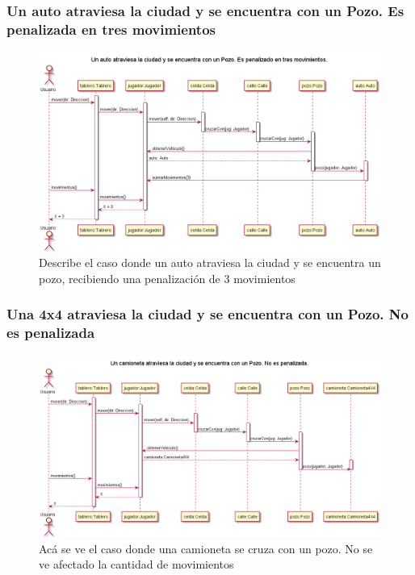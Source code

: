 \documentclass[titlepage,a4paper]{article}
\begin{document}
\subsubsection[Un auto atraviesa la ciudad y se encuentra con un Pozo. Es penalizada en tres movimientos]{Un auto atraviesa la ciudad y se encuentra con un Pozo. Es penalizada en tres movimientos}

\begin{figure}[H]
  \centering
  \includegraphics[width=1\textwidth]{diagramas/SecuenciaAutoCruzaUnPozoYEsPenalizado.png}
  \caption{\label{fig:class01} Describe el caso donde un auto atraviesa la ciudad y se encuentra un pozo, recibiendo una penalización de 3 movimientos}
\end{figure}


\subsubsection[Una 4x4 atraviesa la ciudad y se encuentra con un Pozo. No es penalizada]{Una 4x4 atraviesa la ciudad y se encuentra con un Pozo. No es penalizada}

\begin{figure}[H]
  \centering
  \includegraphics[width=1\textwidth]{diagramas/SecuenciaUnaCamionetaCruzaUnPozoYNoEsPenalizado.png}
  \caption{\label{fig:class01} Acá se ve el caso donde una camioneta se cruza con un pozo. No se ve afectado la cantidad de movimientos}
\end{figure}
\end{document}
